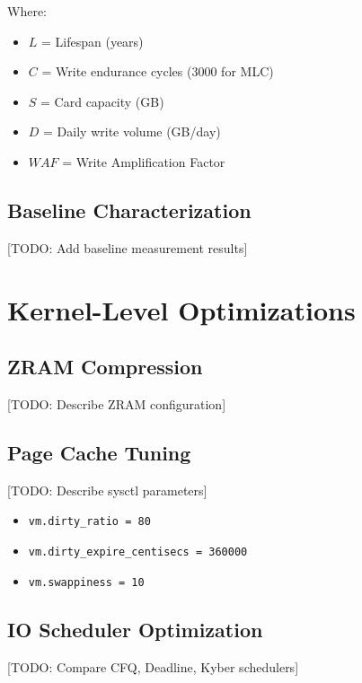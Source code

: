 \documentclass[conference]{IEEEtran}
\begin{document}
Where:
\begin{itemize}
    \item $L$ = Lifespan (years)
    \item $C$ = Write endurance cycles (3000 for MLC)
    \item $S$ = Card capacity (GB)
    \item $D$ = Daily write volume (GB/day)
    \item $WAF$ = Write Amplification Factor
\end{itemize}

\subsection{Baseline Characterization}

[TODO: Add baseline measurement results]

\section{Kernel-Level Optimizations}

\subsection{ZRAM Compression}

[TODO: Describe ZRAM configuration]

\subsection{Page Cache Tuning}

[TODO: Describe sysctl parameters]

\begin{itemize}
    \item \texttt{vm.dirty\_ratio = 80}
    \item \texttt{vm.dirty\_expire\_centisecs = 360000}
    \item \texttt{vm.swappiness = 10}
\end{itemize}

\subsection{IO Scheduler Optimization}

[TODO: Compare CFQ, Deadline, Kyber schedulers]
\end{document}
